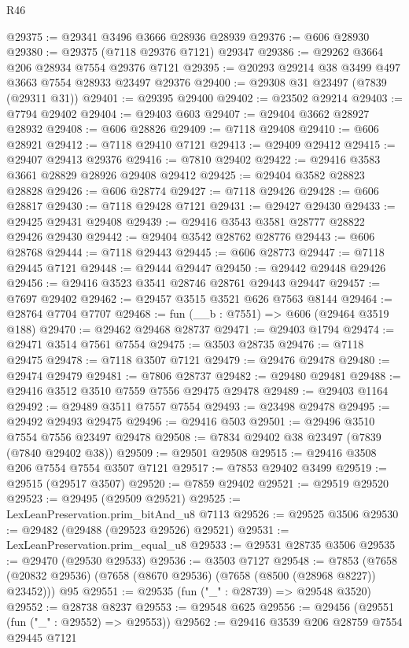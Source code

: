 \begin{lexlean}{R46}
\begin{coremodule}
@29375 := @29341 @3496 @3666 @28936 @28939
@29376 := @606 @28930
@29380 := @29375 (@7118 @29376 @7121) @29347
@29386 := @29262 @3664 @206 @28934 @7554 @29376 @7121
@29395 := @20293 @29214 @38 @3499 @497 @3663 @7554 @28933 @23497 @29376
@29400 := @29308 @31 @23497 (@7839 (@29311 @31))
@29401 := @29395 @29400
@29402 := @23502 @29214
@29403 := @7794 @29402
@29404 := @29403 @603
@29407 := @29404 @3662 @28927 @28932
@29408 := @606 @28826
@29409 := @7118 @29408
@29410 := @606 @28921
@29412 := @7118 @29410 @7121
@29413 := @29409 @29412
@29415 := @29407 @29413 @29376
@29416 := @7810 @29402
@29422 := @29416 @3583 @3661 @28829 @28926 @29408 @29412
@29425 := @29404 @3582 @28823 @28828
@29426 := @606 @28774
@29427 := @7118 @29426
@29428 := @606 @28817
@29430 := @7118 @29428 @7121
@29431 := @29427 @29430
@29433 := @29425 @29431 @29408
@29439 := @29416 @3543 @3581 @28777 @28822 @29426 @29430
@29442 := @29404 @3542 @28762 @28776
@29443 := @606 @28768
@29444 := @7118 @29443
@29445 := @606 @28773
@29447 := @7118 @29445 @7121
@29448 := @29444 @29447
@29450 := @29442 @29448 @29426
@29456 := @29416 @3523 @3541 @28746 @28761 @29443 @29447
@29457 := @7697 @29402
@29462 := @29457 @3515 @3521 @626 @7563 @8144
@29464 := @28764 @7704 @7707
@29468 := fun (__b : @7551) => @606 (@29464 @3519 @188)
@29470 := @29462 @29468 @28737
@29471 := @29403 @1794
@29474 := @29471 @3514 @7561 @7554
@29475 := @3503 @28735
@29476 := @7118 @29475
@29478 := @7118 @3507 @7121
@29479 := @29476 @29478
@29480 := @29474 @29479
@29481 := @7806 @28737
@29482 := @29480 @29481
@29488 := @29416 @3512 @3510 @7559 @7556 @29475 @29478
@29489 := @29403 @1164
@29492 := @29489 @3511 @7557 @7554
@29493 := @23498 @29478
@29495 := @29492 @29493 @29475
@29496 := @29416 @503
@29501 := @29496 @3510 @7554 @7556 @23497 @29478
@29508 := @7834 @29402 @38 @23497 (@7839 (@7840 @29402 @38))
@29509 := @29501 @29508
@29515 := @29416 @3508 @206 @7554 @7554 @3507 @7121
@29517 := @7853 @29402 @3499
@29519 := @29515 (@29517 @3507)
@29520 := @7859 @29402
@29521 := @29519 @29520
@29523 := @29495 (@29509 @29521)
@29525 := LexLeanPreservation.prim_bitAnd_u8 @7113
@29526 := @29525 @3506
@29530 := @29482 (@29488 (@29523 @29526) @29521)
@29531 := LexLeanPreservation.prim_equal_u8
@29533 := @29531 @28735 @3506
@29535 := @29470 (@29530 @29533)
@29536 := @3503 @7127
@29548 := @7853
    (@7658 (@20832 @29536) (@7658 (@8670 @29536) (@7658 (@8500 (@28968 @8227)) @23452)))
    @95
@29551 := @29535 (fun ("_" : @28739) => @29548 @3520)
@29552 := @28738 @8237
@29553 := @29548 @625
@29556 := @29456 (@29551 (fun ("_" : @29552) => @29553))
@29562 := @29416 @3539 @206 @28759 @7554 @29445 @7121

\end{coremodule}
\end{lexlean}
